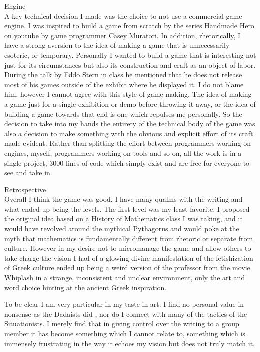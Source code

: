 \documentclass[12pt]{report}
\begin{document}
\begin{description}
\item {\large Engine}\\

    A key technical decision I made was the choice to not use a commercial game engine. I was inspired to build a 
    game from scratch by the series Handmade Hero on youtube by game programmer Casey Muratori. In addition, 
    rhetorically, I have a strong aversion to the idea of making a game that is unnecessarily esoteric, or temporary. 
    Personally I wanted to build a game that is interesting not just for its circumstances but also its construction 
    and craft as an object of labor. During the talk by Eddo Stern in class he mentioned that he does not release 
    most of his games outside of the exhibit where he displayed it. I do not blame him, however I cannot agree with 
    this style of game making. The idea of making a game just for a single exhibition or demo before throwing it away, 
    or the idea of building a game towards that end is one which repulses me personally. So the decision to take into 
    my hands the entirety of the technical body of the game was also a decision to make something with the obvious 
    and explicit effort of its craft made evident. Rather than splitting the effort between programmers working on 
    engines, myself, programmers working on tools and so on, all the work is in a single project, 3000 lines of code 
    which simply exist and are free for everyone to see and take in.

\item {\large Retrospective}\\

    Overall I think the game was good. I have many qualms with the writing and what ended up being the levels.
    The first level was my least favorite. I proposed the original idea based on a History of Mathematics class
    I was taking, and it would have revolved around the mythical Pythagorus and would poke at the myth that mathematics
    is fundamentally different from rhetoric or separate from culture. However in my desire not to micromanage the game 
    and allow others to take charge the vision I had of a glowing divine manifestation of the fetishization of Greek 
    culture ended up being a weird version of the professor from the movie Whiplash in a strange, inconsistent and 
    unclear environment, only the art and word choice hinting at the ancient Greek inspiration.

    To be clear I am very particular in my taste in art. I find no personal value in nonsense as the Dadaists did
    \parencite{sit}, nor do I connect with many of the tactics of the Situationists. I merely find that in giving
    control over the writing to a group member it has become something which I cannot relate to, something which
    is immensely frustrating in the way it echoes my vision but does not truly match it.


\end{description}
\end{document}
